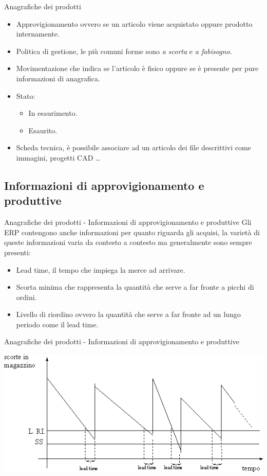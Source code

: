 \documentclass{beamer}
\begin{document}
\begin{frame}{Anagrafiche dei prodotti}
    \begin{itemize}
        \item Approvigionamento ovvero se un articolo viene acquistato oppure prodotto internamente.
        \item Politica di gestione, le più comuni forme sono \textit{a scorta} e \textit{a fabisogno}.
        \item Movimentazione che indica se l'articolo è fisico oppure se è presente per pure informazioni di anagrafica.
        \item Stato:
            \begin{itemize}
                \item In esaurimento.
                \item Esaurito.
            \end{itemize}
        \item Scheda tecnica, è possibile associare ad un articolo dei file descrittivi come immagini, progetti CAD \dots
    \end{itemize}
\end{frame}

\subsection{Informazioni di approvigionamento e produttive}
\begin{frame}{Anagrafiche dei prodotti - Informazioni di approvigionamento e produttive}
    Gli ERP contengono anche informazioni per quanto riguarda gli acquisi, la varietà di queste informazioni varia da contesto a contesto ma generalmente sono sempre presenti:
    \begin{itemize}
        \item Lead time, il tempo che impiega la merce ad arrivare.
        \item Scorta minima che rappresenta la quantità che serve a far fronte a picchi di ordini.
        \item Livello di riordino ovvero la quantità che serve a far fronte ad un lungo periodo come il lead time.
    \end{itemize}
\end{frame}

\begin{frame}{Anagrafiche dei prodotti - Informazioni di approvigionamento e produttive}
    \begin{center}
        \includegraphics[scale=0.5]{livello_di_riordino.png}
    \end{center}
\end{frame}
\end{document}
